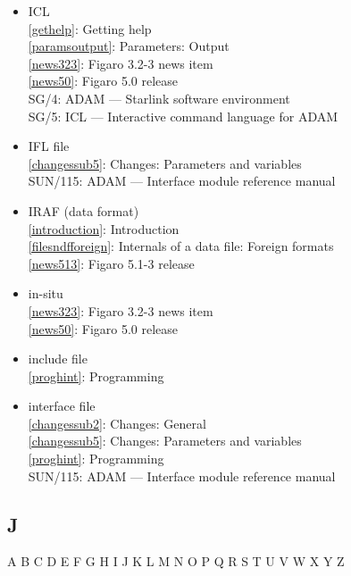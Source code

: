 \documentclass[11pt,twoside]{article}
\newcommand{\htmlref}[2]{#1}
\newcommand{\xref}[3]{#1}
\newcommand{\idxint}[2]{\ref{#1}: \htmlref{#2}{#1}}
\newcommand{\idxint}[2]{\htmlref{#2}{#1}}
\newcommand{\latorhtm}[2]{#1}
\newcommand{\latorhtm}[2]{#2}
\begin{document}
\begin{itemize}
\item ICL\\
   \idxint{gethelp}{Getting help}\\
   \idxint{paramsoutput}{Parameters: Output}\\
   \idxint{news323}{Figaro 3.2-3 news item}\\
   \idxint{news50}{Figaro 5.0 release}\\
   \xref{SG/4: ADAM \latorhtm{---}{-} Starlink software environment}{sg4}{}\\
   \xref{SG/5: ICL \latorhtm{---}{-} Interactive command language for ADAM}{sg5}{}
\item IFL file\\
   \idxint{changessub5}{Changes: Parameters and variables}\\
   \xref{SUN/115: ADAM \latorhtm{---}{-} Interface module reference manual}{sun115}{}
\item IRAF (data format)\\
   \idxint{introduction}{Introduction}\\
   \idxint{filesndfforeign}{Internals of a data file: Foreign formats}\\
   \idxint{news513}{Figaro 5.1-3 release}
\item in-situ\\
   \idxint{news323}{Figaro 3.2-3 news item}\\
   \idxint{news50}{Figaro 5.0 release}
\item include file\\
   \idxint{proghint}{Programming}
\item interface file\\
   \idxint{changessub2}{Changes: General}\\
   \idxint{changessub5}{Changes: Parameters and variables}\\
   \idxint{proghint}{Programming}\\
   \xref{SUN/115: ADAM \latorhtm{---}{-} Interface module reference manual}{sun115}{}
\end{itemize}

\subsection*{\label{index_J}J}

\begin{htmlonly}
\htmlref{A}{index_A}
\htmlref{B}{index_B}
\htmlref{C}{index_C}
\htmlref{D}{index_D}
\htmlref{E}{index_E}
\htmlref{F}{index_F}
\htmlref{G}{index_G}
\htmlref{H}{index_H}
\htmlref{I}{index_I}
J
\htmlref{K}{index_K}
\htmlref{L}{index_L}
\htmlref{M}{index_M}
\htmlref{N}{index_N}
\htmlref{O}{index_O}
\htmlref{P}{index_P}
\htmlref{Q}{index_Q}
\htmlref{R}{index_R}
\htmlref{S}{index_S}
\htmlref{T}{index_T}
\htmlref{U}{index_U}
\htmlref{V}{index_V}
\htmlref{W}{index_W}
\htmlref{X}{index_X}
\htmlref{Y}{index_Y}
Z
\end{htmlonly}
\end{document}
